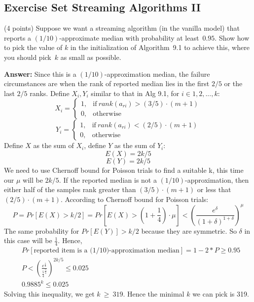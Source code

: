 \documentclass{article}
\renewcommand{\leq}{\leqslant}
\renewcommand{\geq}{\geqslant}
\newcommand{\alg}{{\sc Alg}\xspace}
\newcounter{rcounter}
\newenvironment{rlist}%
{\begin{list}{\setnr-\arabic{rcounter}}{\usecounter{rcounter}}}{\end{list}}
\begin{document}
    \subsection*{Exercise Set Streaming Algorithms II}
    \begin{rlist}
        
        \item (4 points)
        Suppose we want a streaming algorithm (in the vanilla model) that reports a $(1/10)$-approximate median with probability at least~$0.95$. Show how to pick the value of $k$ in the initialization of Algorithm~9.1 to achieve this, where you should pick~$k$ as small as possible.
        
        \textbf{Answer:}
        Since this is a $(1/10)$-approximation median, the failure circumstances are when the rank of reported median lies in the first $2/5$ or the last $2/5$ ranks. Define $X_i, Y_i$ similar to that in \alg 9.1, for $i \in {1,2,...,k}$:
        \begin{equation*}
        X_i=
        \begin{cases}
        1, & \text{if}\ rank(a_{ri})>(3/5)\cdot (m+1) \\
        0, & \text{otherwise}
        \end{cases}
        \end{equation*}
        \begin{equation*}
        Y_i=
        \begin{cases}
        1, & \text{if}\ rank(a_{ri})<(2/5)\cdot (m+1) \\
        0, & \text{otherwise}
        \end{cases}
        \end{equation*}
        Define $X$ as the sum of $X_i$, define $Y$ as the sum of $Y_i$:
        $$E(X)=2k/5$$
        $$E(Y)=2k/5$$
        We need to use Chernoff bound for Poisson trials to find a suitable k, this time our $\mu$ will be $2k/5$.
        If the reported median is not a $(1/10)$-approximation, then either half of the samples rank greater than $(3/5) \cdot (m+1)$ or less that $(2/5) \cdot (m+1)$. According to Chernoff bound for Poisson trials:
        \begin{equation*}
        P=Pr[E(X)>k/2]=Pr[E(X)>(1+\frac{1}{4}) \cdot \mu] < (\frac{e^{\delta}}{(1+\delta)^{1+\delta}})^{\mu}
        \end{equation*}
        The same probability for $Pr[E(Y)]>k/2$ because they are symmetric. So $\delta$ in this case will be $\frac{1}{4}$. Hence,
        \begin{align*}
        &Pr[\text{reported item is a (1/10)-approximation median}]=1-2*P \geq 0.95 \\
        &P < (\frac{e^{\frac{1}{4}}}{\frac{5}{4}^{\frac{5}{4}}})^{2k/5} \leq 0.025 \\
        &0.9885^k \leq 0.025
        \end{align*}
        Solving this inequality, we get $k~\geq~319$. Hence the minimal $k$ we can pick is 319.
        

\end{rlist}
\end{document}
